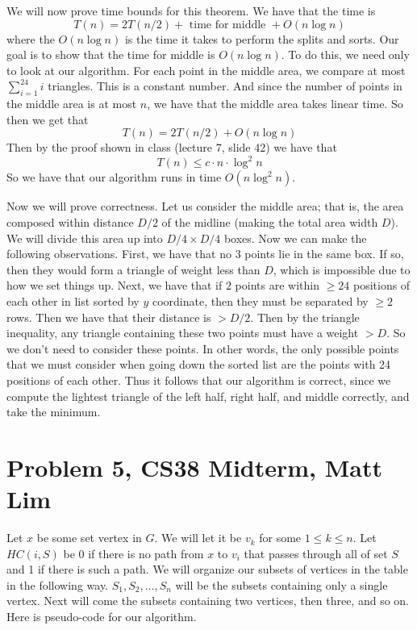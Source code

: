 \documentclass{article}
\begin{document}
\vspace{8mm}
We will now prove time bounds for this theorem. We have that the time is
\[ T(n) = 2T(n/2) + \text{ time for middle } + O(n \log n) \]
where the $O(n \log n)$ is the time it takes to perform the splits and sorts.
Our goal is to show that the time for middle is $O(n \log n)$. To do this,
we need only to look at our algorithm. For each point in the middle area, we
compare at most $\sum_{i=1}^{24} i$ triangles. This is a constant number. And
since the number of points in the middle area is at most $n$, we have that the
middle area takes linear time. So then we get that
\[ T(n) = 2T(n/2) + O(n \log n) \]
Then by the proof shown in class (lecture 7, slide 42) we have that
\[ T(n) \leq c \cdot n \cdot \log^2 n \]
So we have that our algorithm runs in time $O(n \log^2 n)$.

\vspace{8mm}
Now we will prove correctness. Let us consider the middle area; that is, the
area composed within distance $D/2$ of the midline (making the total area width
$D$). We will divide this area up into $D/4 \times D/4$ boxes. Now we can make
the following observations. First, we have that no $3$ points lie in the same
box. If so, then they would form a triangle of weight less than $D$, which is
impossible due to how we set things up. Next, we have that if $2$ points are
within $\ge 24$ positions of each other in list sorted by $y$ coordinate, then
they must be separated by $\ge 2$ rows. Then we have that their distance is $>
D/2$. Then by the triangle inequality, any triangle containing these two points
must have a weight $>D$. So we don't need to consider these points. In other
words, the only possible points that we must consider when going down the sorted
list are the points with 24 positions of each other. Thus it follows that our
algorithm is correct, since we compute the lightest triangle of the left half,
right half, and middle correctly, and take the minimum.
\newpage

\section*{Problem 5, CS38 Midterm, Matt Lim}
Let $x$ be some set vertex in $G$. We will let it be $v_k$ for some $1 \le k \le n$.
Let $HC(i,S)$ be 0 if there
is no path from $x$ to $v_i$ that passes through all of set $S$
and 1 if there is such a path. We
will organize our subsets of vertices in the table in the following way. $S_1,
S_2, \dots, S_n$ will be the subsets containing only a single vertex. Next will
come the subsets containing two vertices, then three, and so on.
Here is pseudo-code for our algorithm.
\end{document}

